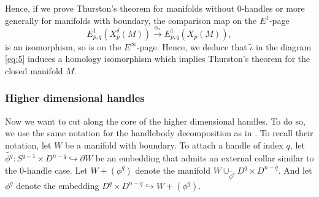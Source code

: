 \documentclass[a4paper]{amsart}
\theoremstyle{definition}
\theoremstyle{remark}
\newtheorem{rem}[thm]{Remark}
\newcommand{\bR}{\mathbb{R}}
\newcommand{\bS}{\mathbb{S}}
\newcommand{\BH}{\mathrm{B}\text{\textnormal{Homeo}}}
\newcommand{\tdH}{\text{Homeo}^{\delta}}
\newcommand{\BdH}{\mathrm{B}\text{\textnormal{Homeo}}^{\delta}}
\numberwithin{equation}{section}
\begin{document}
 Hence, if we prove Thurston's theorem for manifolds without $0$-handles or more generally for manifolds with boundary, the comparison map on the $E^1$-page
\[
E^1_{p,q}(X_{p}^{\delta}(M))\xrightarrow{\alpha_*} E^1_{p,q}(X_{p}(M)),
\]
is an isomorphism, so is on the $E^{\infty}$-page. Hence, we deduce that $\tilde{\iota}$ in the diagram \ref{eq:5} induces a homology isomorphism which implies Thurston's theorem for the closed manifold $M$.
\subsubsection{Higher dimensional handles}\label{high}
Now we want to cut along the core of the higher dimensional handles. To do so, we use the same notation for the handlebody decomposition as in \cite{crowley2014surgery}. To recall their notation, let $W$ be a  manifold with boundary. To attach a handle of index $q$, let $\tilde{\phi^q}: S^{q-1}\times D^{n-q} \hookrightarrow  \partial W$ be an  embedding that admits an external collar similar to the $0$-handle case. Let $W\plus (\phi^q)$ denote the manifold  $W\cup_{\tilde{\phi^q}} D^q\times D^{n-q}$. And let $\phi^q$ denote the embedding $D^q\times D^{n-q}\hookrightarrow W+(\phi^q)$.
\end{document}
